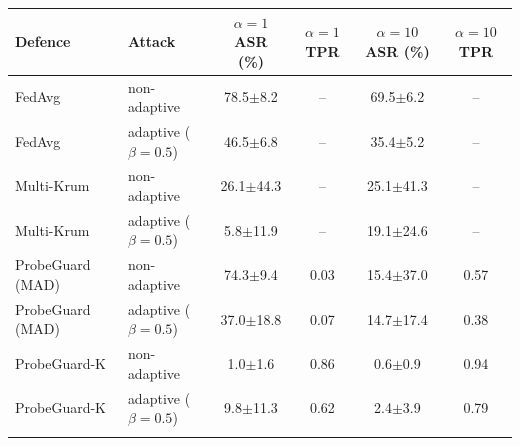 \begin{tabular}{@{}llcccc@{}}
\toprule
Defence & Attack & $\alpha=1$ ASR (\%) & $\alpha=1$ TPR & $\alpha=10$ ASR (\%) & $\alpha=10$ TPR\\
\midrule
FedAvg & non-adaptive & 78.5$\pm$8.2 & -- & 69.5$\pm$6.2 & --\\
FedAvg & adaptive ($\beta{=}0.5$) & 46.5$\pm$6.8 & -- & 35.4$\pm$5.2 & --\\
\addlinespace
Multi-Krum & non-adaptive & 26.1$\pm$44.3 & -- & 25.1$\pm$41.3 & --\\
Multi-Krum & adaptive ($\beta{=}0.5$) & 5.8$\pm$11.9 & -- & 19.1$\pm$24.6 & --\\
\addlinespace
ProbeGuard (MAD) & non-adaptive & 74.3$\pm$9.4 & 0.03 & 15.4$\pm$37.0 & 0.57\\
ProbeGuard (MAD) & adaptive ($\beta{=}0.5$) & 37.0$\pm$18.8 & 0.07 & 14.7$\pm$17.4 & 0.38\\
\addlinespace
ProbeGuard-K & non-adaptive & 1.0$\pm$1.6 & 0.86 & 0.6$\pm$0.9 & 0.94\\
ProbeGuard-K & adaptive ($\beta{=}0.5$) & 9.8$\pm$11.3 & 0.62 & 2.4$\pm$3.9 & 0.79\\
\addlinespace
\bottomrule
\end{tabular}